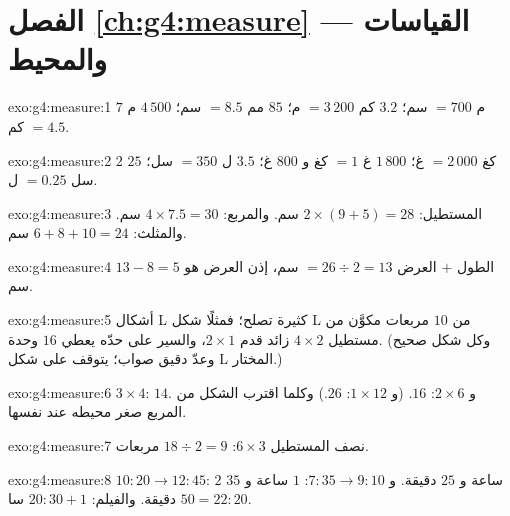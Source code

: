 \section*{الفصل \ref{ch:g4:measure} --- القياسات والمحيط}

\begin{solution}{exo:g4:measure:1}
$7$ م $= 700$ سم؛ \quad $3.2$ كم $= 3\,200$ م؛ \quad
$85$ مم $= 8.5$ سم؛ \quad $4\,500$ م $= 4.5$ كم.
\end{solution}

\begin{solution}{exo:g4:measure:2}
$2$ كغ $= 2\,000$ غ؛ \quad $1\,800$ غ $= 1$ كغ و $800$ غ؛ \quad
$3.5$ ل $= 350$ سل؛ \quad $25$ سل $= 0.25$ ل.
\end{solution}

\begin{solution}{exo:g4:measure:3}
المستطيل: $2 \times (9 + 5) = 28$ سم. والمربع:
$4 \times 7.5 = 30$ سم. والمثلث: $6 + 8 + 10 = 24$ سم.
\end{solution}

\begin{solution}{exo:g4:measure:4}
الطول $+$ العرض $= 26 \div 2 = 13$ سم، إذن العرض هو
$13 - 8 = 5$ سم.
\end{solution}

\begin{solution}{exo:g4:measure:5}
أشكال L كثيرة تصلح؛ فمثلًا شكل L من $10$ مربعات مكوَّن من
مستطيل $4 \times 2$ زائد قدم $2 \times 1$، والسير على حدّه يعطي $16$
وحدة. (وكل شكل صحيح وعدّ دقيق صواب؛ 
يتوقف على شكل L المختار.)
\end{solution}

\begin{solution}{exo:g4:measure:6}
$3 \times 4$:  $14$. و $2 \times 6$:  $16$.
(و $1 \times 12$:  $26$.) وكلما اقترب الشكل من المربع
صغر محيطه عند  نفسها.
\end{solution}

\begin{solution}{exo:g4:measure:7}
نصف  المستطيل $6 \times 3$: $18 \div 2 = 9$ مربعات.
\end{solution}

\begin{solution}{exo:g4:measure:8}
$10{:}20 \to 12{:}45$: $2$ ساعة و $25$ دقيقة. و $7{:}35 \to 9{:}10$:
$1$ ساعة و $35$ دقيقة. والفيلم: $20{:}30 + 1$ سا $50 = 22{:}20$.
\end{solution}

